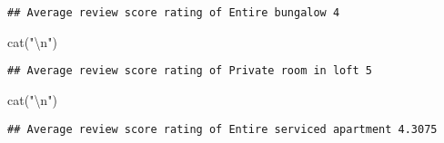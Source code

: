 \documentclass[
]{article}
\newenvironment{Shaded}{\begin{snugshade}}{\end{snugshade}}
\newcommand{\FunctionTok}[1]{\textcolor[rgb]{0.00,0.00,0.00}{#1}}
\newcommand{\NormalTok}[1]{#1}
\newcommand{\OtherTok}[1]{\textcolor[rgb]{0.56,0.35,0.01}{#1}}
\newcommand{\SpecialCharTok}[1]{\textcolor[rgb]{0.00,0.00,0.00}{#1}}
\newcommand{\StringTok}[1]{\textcolor[rgb]{0.31,0.60,0.02}{#1}}
\begin{document}
\begin{verbatim}
## Average review score rating of Entire bungalow 4
\end{verbatim}

\begin{Shaded}
\begin{Highlighting}[]
\FunctionTok{cat}\NormalTok{(}\StringTok{"}\SpecialCharTok{\textbackslash{}n}\StringTok{"}\NormalTok{)}
\end{Highlighting}
\end{Shaded}

\begin{Shaded}
\end{Shaded}

\begin{verbatim}
## Average review score rating of Private room in loft 5
\end{verbatim}

\begin{Shaded}
\begin{Highlighting}[]
\FunctionTok{cat}\NormalTok{(}\StringTok{"}\SpecialCharTok{\textbackslash{}n}\StringTok{"}\NormalTok{)}
\end{Highlighting}
\end{Shaded}

\begin{Shaded}
\end{Shaded}

\begin{verbatim}
## Average review score rating of Entire serviced apartment 4.3075
\end{verbatim}
\end{document}
